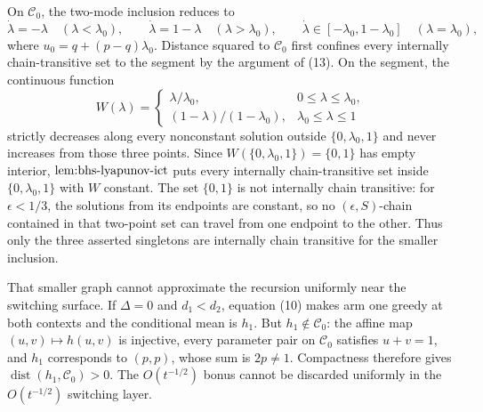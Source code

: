 On \(\mathcal C_0\), the two-mode inclusion reduces to
\[
 \dot\lambda=-\lambda\quad(\lambda<\lambda_0),\qquad
 \dot\lambda=1-\lambda\quad(\lambda>\lambda_0),\qquad
 \dot\lambda\in[-\lambda_0,1-\lambda_0]\quad(\lambda=\lambda_0), \tag{16}
\]
where \(u_0=q+(p-q)\lambda_0\).  Distance squared to \(\mathcal C_0\) first confines every internally chain-transitive set to the segment by the argument of (13).  On the segment, the continuous function
\[
 W(\lambda)=
 \begin{cases}
 \lambda/\lambda_0,&0\leq\lambda\leq\lambda_0,\\
 (1-\lambda)/(1-\lambda_0),&\lambda_0\leq\lambda\leq1
 \end{cases}
\]
strictly decreases along every nonconstant solution outside \(\{0,\lambda_0,1\}\) and never increases from those three points.  Since \(W(\{0,\lambda_0,1\})=\{0,1\}\) has empty interior, \(\textnormal{lem:bhs-lyapunov-ict}\) puts every internally chain-transitive set inside \(\{0,\lambda_0,1\}\) with \(W\) constant.  The set \(\{0,1\}\) is not internally chain transitive: for \(\epsilon<1/3\), the solutions from its endpoints are constant, so no \((\epsilon,S)\)-chain contained in that two-point set can travel from one endpoint to the other.  Thus only the three asserted singletons are internally chain transitive for the smaller inclusion.

That smaller graph cannot approximate the recursion uniformly near the switching surface.  If \(\Delta=0\) and \(d_1<d_2\), equation (10) makes arm one greedy at both contexts and the conditional mean is \(h_1\).  But \(h_1\notin\mathcal C_0\): the affine map \((u,v)\mapsto h(u,v)\) is injective, every parameter pair on \(\mathcal C_0\) satisfies \(u+v=1\), and \(h_1\) corresponds to \((p,p)\), whose sum is \(2p\neq1\).  Compactness therefore gives \(\operatorname{dist}(h_1,\mathcal C_0)>0\).  The \(O(t^{-1/2})\) bonus cannot be discarded uniformly in the \(O(t^{-1/2})\) switching layer.

